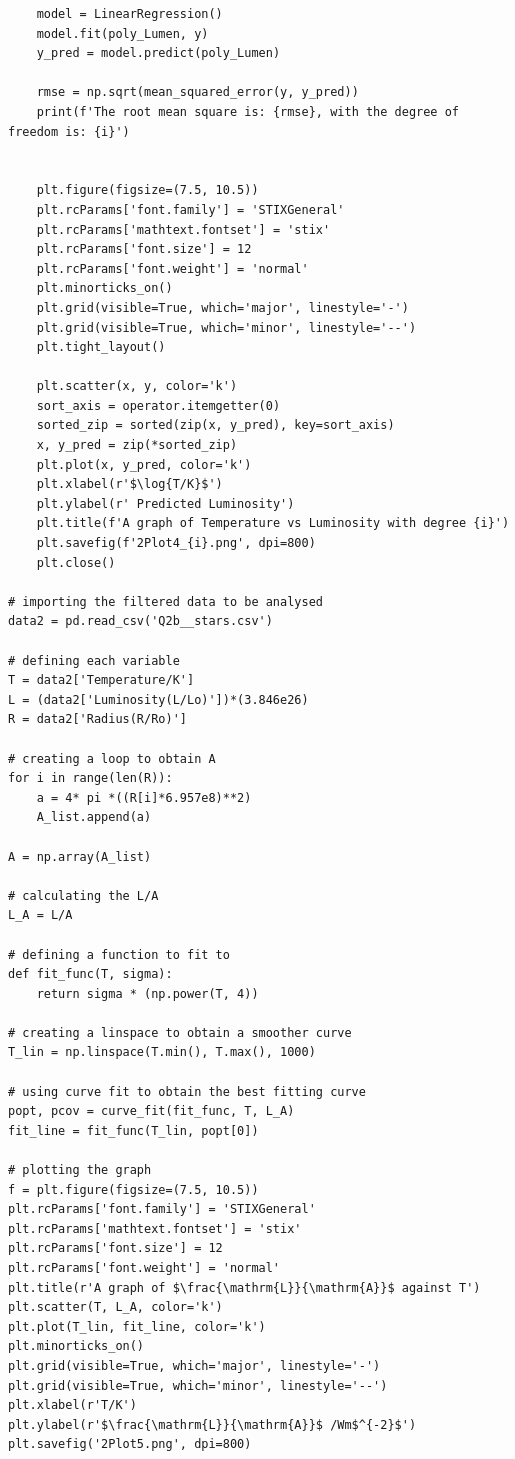 \documentclass[12pt, a4paper]{article}
\begin{document}
\begin{verbatim}
    model = LinearRegression()
    model.fit(poly_Lumen, y)
    y_pred = model.predict(poly_Lumen)

    rmse = np.sqrt(mean_squared_error(y, y_pred))
    print(f'The root mean square is: {rmse}, with the degree of freedom is: {i}')


    plt.figure(figsize=(7.5, 10.5))
    plt.rcParams['font.family'] = 'STIXGeneral'
    plt.rcParams['mathtext.fontset'] = 'stix'
    plt.rcParams['font.size'] = 12
    plt.rcParams['font.weight'] = 'normal'
    plt.minorticks_on()
    plt.grid(visible=True, which='major', linestyle='-')
    plt.grid(visible=True, which='minor', linestyle='--')
    plt.tight_layout()

    plt.scatter(x, y, color='k')
    sort_axis = operator.itemgetter(0)
    sorted_zip = sorted(zip(x, y_pred), key=sort_axis)
    x, y_pred = zip(*sorted_zip)
    plt.plot(x, y_pred, color='k')
    plt.xlabel(r'$\log{T/K}$')
    plt.ylabel(r' Predicted Luminosity')
    plt.title(f'A graph of Temperature vs Luminosity with degree {i}')
    plt.savefig(f'2Plot4_{i}.png', dpi=800)
    plt.close()

# importing the filtered data to be analysed
data2 = pd.read_csv('Q2b__stars.csv')

# defining each variable
T = data2['Temperature/K']
L = (data2['Luminosity(L/Lo)'])*(3.846e26)
R = data2['Radius(R/Ro)']

# creating a loop to obtain A
for i in range(len(R)):
    a = 4* pi *((R[i]*6.957e8)**2)
    A_list.append(a)

A = np.array(A_list)

# calculating the L/A
L_A = L/A

# defining a function to fit to
def fit_func(T, sigma):
    return sigma * (np.power(T, 4))

# creating a linspace to obtain a smoother curve
T_lin = np.linspace(T.min(), T.max(), 1000)

# using curve fit to obtain the best fitting curve
popt, pcov = curve_fit(fit_func, T, L_A)
fit_line = fit_func(T_lin, popt[0])

# plotting the graph
f = plt.figure(figsize=(7.5, 10.5))
plt.rcParams['font.family'] = 'STIXGeneral'
plt.rcParams['mathtext.fontset'] = 'stix'
plt.rcParams['font.size'] = 12
plt.rcParams['font.weight'] = 'normal'
plt.title(r'A graph of $\frac{\mathrm{L}}{\mathrm{A}}$ against T')
plt.scatter(T, L_A, color='k')
plt.plot(T_lin, fit_line, color='k')
plt.minorticks_on()
plt.grid(visible=True, which='major', linestyle='-')
plt.grid(visible=True, which='minor', linestyle='--')
plt.xlabel(r'T/K')
plt.ylabel(r'$\frac{\mathrm{L}}{\mathrm{A}}$ /Wm$^{-2}$')
plt.savefig('2Plot5.png', dpi=800)


\end{verbatim}
\end{document}
